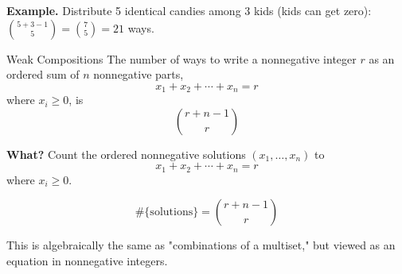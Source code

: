 \textbf{Example.} Distribute 5 identical candies among 3 kids (kids 
can get zero): $\binom{5+3-1}{5}=\binom{7}{5}=21$ ways.

\newpage

\begin{define}{Weak Compositions}
The number of ways to write a nonnegative integer $r$ as an ordered 
sum of $n$ nonnegative parts,
$$x_1 + x_2 + \cdots + x_n = r$$
where $x_i \geq 0$,
is
$$\binom{r + n - 1}{r}$$
\end{define}

\textbf{What?} Count the ordered nonnegative solutions $(x_1,\dots,x_n)$ to
$$x_1 + x_2 + \cdots + x_n = r$$
where $x_i \geq 0$.

$$\#\{\text{solutions}\} = \binom{r + n - 1}{r}$$

This is algebraically the same as "combinations of a multiset," but 
viewed as an equation in nonnegative integers.